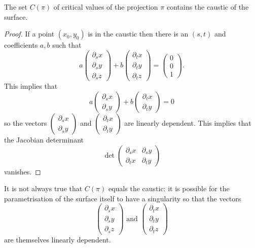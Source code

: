 \begin{lma}
The set $C(\pi)$ of critical values of the projection $\pi$ contains the caustic of the surface.
\end{lma}
\begin{proof}
If a point $(x_0,y_0)$ is in the caustic then there is an $(s,t)$ and coefficients $a,b$ such that
\[a\left(\begin{array}{c}\partial_sx\\\partial_sy\\\partial_sz\end{array}\right)+b\left(\begin{array}{c}\partial_tx\\\partial_ty\\\partial_tz\end{array}\right)=\left(\begin{array}{c}0\\0\\1\end{array}\right).\]
This implies that
\[a\left(\begin{array}{c}\partial_sx\\\partial_sy\end{array}\right)+b\left(\begin{array}{c}\partial_tx\\\partial_ty\end{array}\right)=0\]
so the vectors $\left(\begin{array}{c}\partial_sx\\\partial_sy\end{array}\right)$ and $\left(\begin{array}{c}\partial_tx\\\partial_ty\end{array}\right)$ are linearly dependent. This implies that the Jacobian determinant
\[\det\left(\begin{array}{cc}\partial_sx & \partial_sy\\ \partial_tx & \partial_ty\end{array}\right)\]
vanishes.
\end{proof}
\begin{rmk}
It is not always true that $C(\pi)$ equals the caustic: it is possible for the parametrisation of the surface itself to have a singularity so that the vectors
\[\left(\begin{array}{c}\partial_sx\\\partial_sy\\\partial_sz\end{array}\right)\mbox{ and }\left(\begin{array}{c}\partial_tx\\\partial_ty\\\partial_tz\end{array}\right)\]
are themselves linearly dependent.
\end{rmk}

